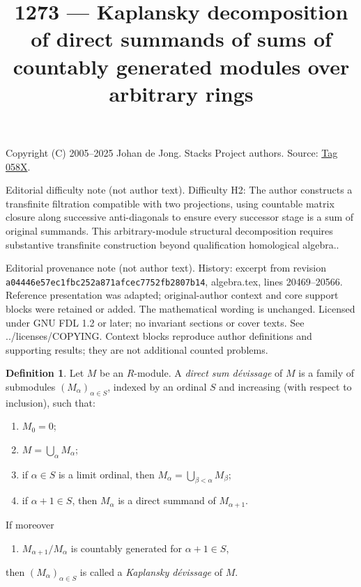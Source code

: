 \documentclass{amsart}
\theoremstyle{plain}
\theoremstyle{definition}
\newtheorem{definition}[subsection]{Definition}
\theoremstyle{remark}
\numberwithin{equation}{subsection}
\begin{document}
\title[Stacks Project, Tag 058X]{1273 --- Kaplansky decomposition of direct summands of sums of countably generated modules over arbitrary rings}
\maketitle
\noindent Copyright (C) 2005--2025 Johan de Jong. Stacks Project authors. Source: \href{https://stacks.math.columbia.edu/tag/058X}{Tag 058X}.

\noindent Editorial difficulty note (not author text). Difficulty H2: The author constructs a transfinite filtration compatible with two projections, using countable matrix closure along successive anti-diagonals to ensure every successor stage is a sum of original summands. This arbitrary-module structural decomposition requires substantive transfinite construction beyond qualification homological algebra..

\noindent Editorial provenance note (not author text). History: excerpt from revision \texttt{a0444\allowbreak 6e57e\allowbreak c1fbc\allowbreak 252a8\allowbreak 71afc\allowbreak ec775\allowbreak 2fb28\allowbreak 07b14}, algebra.tex, lines 20469--20566. Reference presentation was adapted; original-author context and core support blocks were retained or added. The mathematical wording is unchanged. Licensed under GNU FDL 1.2 or later; no invariant sections or cover texts. See ../licenses/COPYING. Context blocks reproduce author definitions and supporting results; they are not additional counted problems.

\begin{definition}
\label{definition-devissage}
Let $M$ be an $R$-module.  A {\it direct sum d\'evissage} of $M$ is a family
of submodules $(M_{\alpha})_{\alpha \in S}$, indexed by an ordinal $S$ and
increasing (with respect to inclusion), such that:
\begin{enumerate}
\item[(0)] $M_0 = 0$;
\item[(1)] $M = \bigcup_{\alpha} M_{\alpha}$;
\item[(2)] if $\alpha \in S$ is a limit ordinal, then $M_{\alpha} =
\bigcup_{\beta < \alpha} M_{\beta}$;
\item[(3)] if $\alpha + 1 \in S$, then $M_{\alpha}$ is a direct summand of
$M_{\alpha + 1}$.
\end{enumerate}
If moreover
\begin{enumerate}
\item[(4)] $M_{\alpha + 1}/M_{\alpha}$ is countably generated for
$\alpha + 1 \in S$,
\end{enumerate}
then $(M_{\alpha})_{\alpha \in S}$ is called a {\it Kaplansky d\'evissage}
of $M$.
\end{definition}
\end{document}
